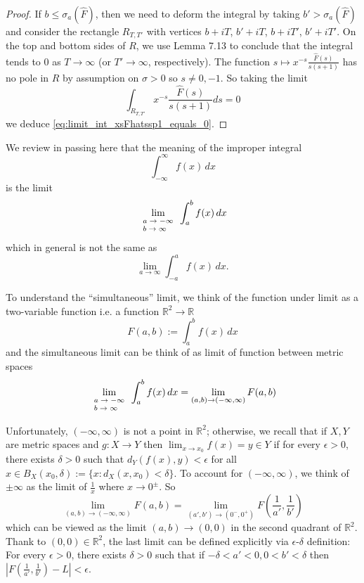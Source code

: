 \documentclass[12pt]{article}
\newcommand{\Fhat}{\widehat{F}}
\newcommand{\R}{\mathbb{R}}
\begin{document}
\begin{proof}
If $b \leq \sigma_a(\Fhat)$, then we need to deform the integral by taking $b' > \sigma_a(\Fhat)$ and consider the rectangle $R_{T,T'}$ with vertices $b + iT$, $b' + iT$, $b + iT'$, $b' + iT'$. On the top and bottom sides of $R$, we use Lemma 7.13 to conclude that the integral tends to 0 as $T \rightarrow \infty$ (or $T' \rightarrow \infty$, respectively). The function $s \mapsto x^{-s} \frac{\Fhat(s)}{s(s + 1)}$ has no pole in $R$ by assumption on $\sigma > 0$ so $s \not= 0, -1$. So taking the limit
$$\int_{R_{T,T'}} x^{-s} \frac{\Fhat(s)}{s(s + 1)} ds = 0$$
we deduce \eqref{eq:limit_int_xsFhatssp1_equals_0}.
\end{proof}

We review in passing here that the meaning of the improper integral
$$\int_{-\infty}^{\infty} f(x) \, dx$$
is the limit
$$\lim_{\scriptsize\begin{array}{l} a \rightarrow -\infty\\ b \rightarrow \infty\end{array}} \int_a^b f(x) \, dx$$
which in general is not the same as
$$\lim_{a \rightarrow \infty} \int_{-a}^a f(x) \, dx.$$

To understand the ``simultaneous'' limit, we think of the function under limit as a two-variable function i.e. a function $\R^2 \rightarrow \R$
$$F(a, b) := \int_a^b f(x) \, dx$$
and the simultaneous limit can be think of as limit of function between metric spaces
$$\lim_{\scriptsize\begin{array}{l} a \rightarrow -\infty\\ b \rightarrow \infty\end{array}} \int_a^b f(x) \, dx = \lim_{(a, b) \rightarrow (-\infty, \infty)} F(a, b)$$

Unfortunately, $(-\infty, \infty)$ is not a point in $\R^2$; otherwise, we recall that if $X, Y$ are metric spaces and $g : X \rightarrow Y$ then $\lim_{x \rightarrow x_0} f(x) = y \in Y$ if for every $\epsilon > 0$, there exists $\delta > 0$ such that $d_Y (f(x), y) < \epsilon$ for all $x \in B_X(x_0, \delta) := \{x : d_X(x, x_0) < \delta\}$. To account for $(-\infty, \infty)$, we think of $\pm \infty$ as the limit of $\frac{1}{x}$ where $x \rightarrow 0^\pm$. So
$$\lim_{(a, b) \rightarrow (-\infty, \infty)} F(a, b) = \lim_{(a', b') \rightarrow (0^-, 0^+)} F\left(\frac{1}{a'}, \frac{1}{b'}\right)$$
which can be viewed as the limit $(a, b) \rightarrow (0, 0)$ in the second quadrant of $\R^2$. Thank to $(0, 0) \in \R^2$, the last limit can be defined explicitly via $\epsilon$-$\delta$ definition: For every $\epsilon > 0$, there exists $\delta > 0$ such that if $-\delta < a' < 0, 0 < b' < \delta$ then $|F\left(\frac{1}{a'}, \frac{1}{b'}\right) - L| < \epsilon$.
\end{document}
